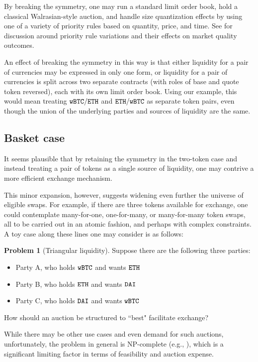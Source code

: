 \documentclass[11pt, reqno]{amsart}
\theoremstyle{definition}
\newtheorem{problem}{Problem}[subsection]
\theoremstyle{remark}
\newcommand{\BTC}{\textnormal{\texttt{wBTC}}}
\newcommand{\ETH}{\textnormal{\texttt{ETH}}}
\newcommand{\DAI}{\textnormal{\texttt{DAI}}}
\begin{document}
By breaking the symmetry, one may run a standard limit order book, hold a
classical Walrasian-style auction, and handle size quantization effects by
using one of a variety of priority rules based on quantity, price, and time.
See \cite{BeLaLiVa22} for discussion around priority rule variations and their
effects on market quality outcomes.

An effect of breaking the symmetry in this way is that either liquidity for a
pair of currencies may be expressed in only one form, or liquidity for a pair
of currencies is split across two separate contracts (with roles of base and
quote token reversed), each with its own limit order book.
Using our example, this would mean treating $\BTC/\ETH$ and $\ETH/\BTC$ as
separate token pairs, even though the union of the underlying parties and
sources of liquidity are the same.

\subsection{Basket case}
It seems plausible that by retaining the symmetry in the two-token case and
instead treating a pair of tokens as a single source of liquidity, one may
contrive a more efficient exchange mechanism.

This minor expansion, however, suggests widening even further the universe of
eligible swaps. For example, if there are three tokens available for exchange,
one could contemplate many-for-one, one-for-many, or many-for-many token swaps,
all to be carried out in an atomic fashion, and perhaps with complex
constraints. A toy case along these lines one may consider is as follows:
\begin{problem}[Triangular liquidity]
Suppose there are the following three parties:
\begin{itemize}
	\item Party A, who holds $\BTC$ and wants $\ETH$
	\item Party B, who holds $\ETH$ and wants $\DAI$
	\item Party C, who holds $\DAI$ and wants $\BTC$
\end{itemize}
How should an auction be structured to ``best" facilitate exchange?
\end{problem}
While there may be other use cases and even demand for such auctions,
unfortunately, the problem in general is NP-complete (e.g., \cite{XiStWh05}),
which is a significant limiting factor in terms of feasibility and
auction expense.
\end{document}
